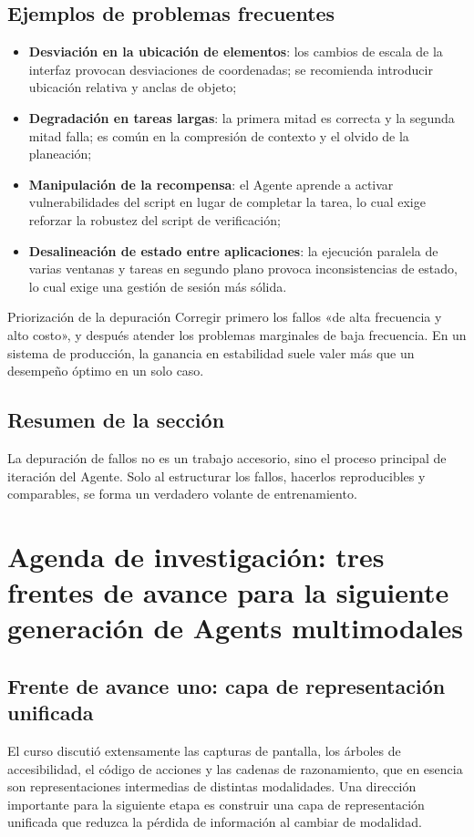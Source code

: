 \documentclass[a4paper]{article}
\begin{document}
\subsection{Ejemplos de problemas frecuentes}
\begin{itemize}
    \item \textbf{Desviación en la ubicación de elementos}: los cambios de escala de la interfaz provocan desviaciones de coordenadas; se recomienda introducir ubicación relativa y anclas de objeto;
    \item \textbf{Degradación en tareas largas}: la primera mitad es correcta y la segunda mitad falla; es común en la compresión de contexto y el olvido de la planeación;
    \item \textbf{Manipulación de la recompensa}: el Agente aprende a activar vulnerabilidades del script en lugar de completar la tarea, lo cual exige reforzar la robustez del script de verificación;
    \item \textbf{Desalineación de estado entre aplicaciones}: la ejecución paralela de varias ventanas y tareas en segundo plano provoca inconsistencias de estado, lo cual exige una gestión de sesión más sólida.
\end{itemize}

\begin{importantbox}{Priorización de la depuración}
Corregir primero los fallos «de alta frecuencia y alto costo», y después atender los problemas marginales de baja frecuencia. En un sistema de producción, la ganancia en estabilidad suele valer más que un desempeño óptimo en un solo caso.
\end{importantbox}

\subsection{Resumen de la sección}
La depuración de fallos no es un trabajo accesorio, sino el proceso principal de iteración del Agente. Solo al estructurar los fallos, hacerlos reproducibles y comparables, se forma un verdadero volante de entrenamiento.

\section{Agenda de investigación: tres frentes de avance para la siguiente generación de Agents multimodales}

\subsection{Frente de avance uno: capa de representación unificada}
El curso discutió extensamente las capturas de pantalla, los árboles de accesibilidad, el código de acciones y las cadenas de razonamiento, que en esencia son representaciones intermedias de distintas modalidades. Una dirección importante para la siguiente etapa es construir una capa de representación unificada que reduzca la pérdida de información al cambiar de modalidad.
\end{document}
